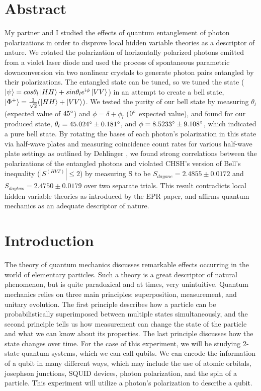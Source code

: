 \documentclass{article}
\begin{document}
\section{Abstract}
    My partner and I studied the effects of quantum entanglement of photon polarizations in order to disprove local hidden variable theories as a descriptor of nature. We rotated the polarization of horizontally polarized photons emitted from a violet laser diode and used the process of spontaneous parametric downconversion via two nonlinear crystals to generate photon pairs entangled by their polarizations. The entangled state can be tuned, so we tuned the state ($\left\vert{\psi}\right\rangle = cos\theta_l \left\vert{HH}\right\rangle + sin\theta_l e^{i\phi} \left\vert{VV}\right\rangle$) in an attempt to create a bell state, $\left\vert{\Phi^+}\right\rangle = \frac{1}{\sqrt{2}}(\left\vert{HH}\right\rangle + \left\vert{VV}\right\rangle)$. We tested the purity of our bell state  by measuring $\theta_l$ (expected value of $45\degree$) and $\phi = \delta + \phi_l$ ($0\degree$ expected value), and found for our produced state, $\theta_l = 45.024\degree \pm 0.181 \degree$, and $\phi = 8.5233\degree \pm 9.108\degree$, which indicated a pure bell state. By rotating the bases of each photon's polarization in this state via half-wave plates and measuring coincidence count rates for various half-wave plate settings as outlined by Dehlinger \cite{deh}, we found strong correlations between the polarizations of the entangled photons and violated CHSH's version of Bell's inequality ($|S^{(HVT)}| \leq 2$) by measuring S to be $S_{day one} = 2.4855 \pm 0.0172$ and $S_{day two} = 2.4750 \pm 0.0179$ over two separate trials. This result contradicts local hidden variable theories as introduced by the EPR paper, and affirms quantum mechanics as an adequate descriptor of nature.


\section{Introduction}
    The theory of quantum mechanics discusses  remarkable effects occurring in the world of elementary particles. Such a theory is a great descriptor of natural phenomenon, but is quite paradoxical and at times, very unintuitive. Quantum mechanics relies on three main principles: superposition, measurement, and unitary evolution. The first principle describes how a particle can be probabilistically superimposed between multiple states simultaneously, and the second principle tells us how measurement can change the state of the particle and what we can know about its properties. The last principle discusses how the state changes over time. For the case of this experiment, we will be studying 2-state quantum systems, which we can call qubits. We can encode the information of a qubit in many different ways, which may include the use of atomic orbitals, josephson junctions, SQUID devices, photon polarization, and the spin of a particle. This experiment will utilize a photon's polarization to describe a qubit.\cite{vaz}
    
\end{document}
